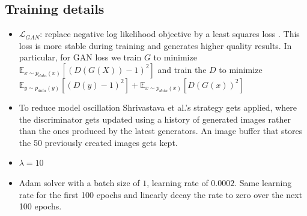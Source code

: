 \documentclass{scrartcl}
\begin{document}
\subsection*{Training details}
\begin{itemize}
	\item
		$\mathcal{L}_{GAN}$: replace negative log likelihood objective by a least squares loss \cite{DBLP:journals/corr/MaoLXLW16}. This loss is more stable during training and generates higher quality results. In particular, for GAN loss we train $G$ to minimize $\mathbb{E}_{x \sim p_{data}(x)} [(D(G(X)) - 1)^2]$ and train the $D$ to minimize $\mathbb{E}_{y \sim p_{data}(y)}[(D(y) - 1)^2] + \mathbb{E}_{x \sim p_{data}(x)}[D(G(x))^2]$
	\item
		To reduce model oscillation Shrivastava et al.'s \cite{DBLP:journals/corr/ShrivastavaPTSW16} strategy gets applied, where the discriminator gets updated using a history of generated images rather than the ones produced by the latest generators. An image buffer that stores the 50 previously created images gets kept.
	\item
		$\lambda = 10$ 
	\item
		Adam solver with a batch size of $1$, learning rate of $0.0002$. Same learning rate for the first 100 epochs and linearly decay the rate to zero over the next 100 epochs.
\end{itemize}
\newpage


\end{document}
